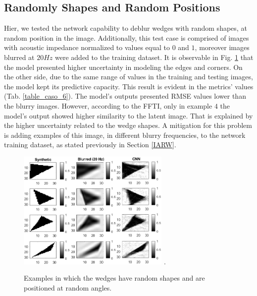 \documentclass[conference]{IEEEtran}
\begin{document}
\subsection{Randomly Shapes and Random Positions}
Hier, we tested the network capability to deblur wedges with random shapes, at random position in the image. Additionally, this test case is comprised of images with acoustic impedance normalized to values equal to $0$ and $1$, moreover images blurred at $20Hz$ were added to the training dataset.
It is observable in Fig. \ref{fig_scenario4} that the model presented higher uncertainty
in modeling the edges and corners. On the other side, due to the same range of values
in the training and testing images, the model kept its predictive capacity. This result is evident in the metrics' values
(Tab. \ref{table_caso_6}). The model's outputs presented RMSE values lower than the blurry images. However, according to the FFTI, only in example $4$ the model's output showed higher
similarity to the latent image. That is explained by the higher uncertainty related to the wedge shapes. A mitigation for this problem is adding examples of this image, in different blurry frequencies, to the network training dataset, as stated previously in
Section \ref{IARW}.
\begin{figure}[!t]
	\centering
	\includegraphics[width=2.9in]{Figs/teste4}
	\DeclareGraphicsExtensions.
	\caption{Examples in which the wedges have random shapes and are positioned at random angles.}
	\label{fig_scenario4}
\end{figure}
\end{document}
